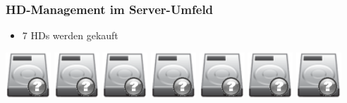 \documentclass{beamer}
\begin{document}
  \frame
  {
  }

  \frame
  {
    \frametitle{HD-Management im Server-Umfeld}
    
    \begin{itemize}
    \item{7 HDs werden gekauft}
    \end{itemize}

    \resizebox{40pt}{40pt}
    {
      \includegraphics{img/hdd_big_unknown.png}
    }
    \resizebox{40pt}{40pt}
    {
      \includegraphics{img/hdd_big_unknown.png}
    }
    \resizebox{40pt}{40pt}
    {
      \includegraphics{img/hdd_big_unknown.png}
    }
    \resizebox{40pt}{40pt}
    {
      \includegraphics{img/hdd_big_unknown.png}
    }
    \resizebox{40pt}{40pt}
    {
      \includegraphics{img/hdd_big_unknown.png}
    }
    \resizebox{40pt}{40pt}
    {
      \includegraphics{img/hdd_big_unknown.png}
    }
    \resizebox{40pt}{40pt}
    {
      \includegraphics{img/hdd_big_unknown.png}
    }
  }
\end{document}

